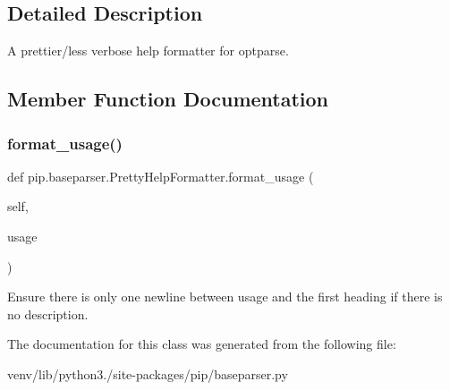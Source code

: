 \subsection{Detailed Description}
\begin{DoxyVerb}A prettier/less verbose help formatter for optparse.\end{DoxyVerb}
 

\subsection{Member Function Documentation}
\mbox{\label{classpip_1_1baseparser_1_1_pretty_help_formatter_a456d048a07092e37ae045eed08a37347}} 
\subsubsection{\texorpdfstring{format\+\_\+usage()}{format\_usage()}}
{\footnotesize\ttfamily def pip.\+baseparser.\+Pretty\+Help\+Formatter.\+format\+\_\+usage (\begin{DoxyParamCaption}\item[{}]{self,  }\item[{}]{usage }\end{DoxyParamCaption})}

\begin{DoxyVerb}Ensure there is only one newline between usage and the first heading
if there is no description.
\end{DoxyVerb}
 

The documentation for this class was generated from the following file\+:\begin{DoxyCompactItemize}
\item 
venv/lib/python3./site-\/packages/pip/baseparser.\+py\end{DoxyCompactItemize}
